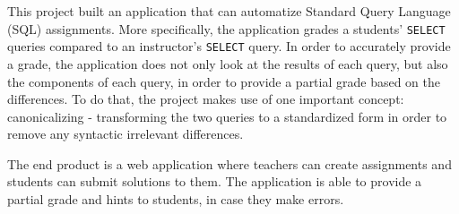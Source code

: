 This project built an application that can automatize Standard Query Language (SQL) assignments. More specifically, the application grades a students' \texttt{SELECT} queries compared to an instructor's \texttt{SELECT} query. In order to accurately provide a grade, the application does not only look at the results of each query, but also the components of each query, in order to provide a partial grade based on the differences. To do that, the project makes use of one important concept: canonicalizing - transforming the two queries to a standardized form in order to remove any syntactic irrelevant differences.

The end product is a web application where teachers can create assignments and students can submit solutions to them. The application is able to provide a partial grade and hints to students, in case they make errors.